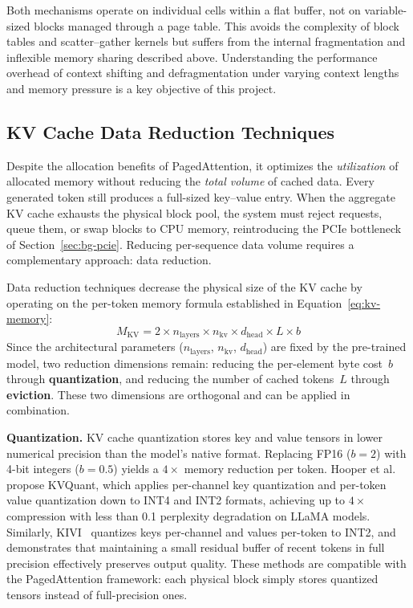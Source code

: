 \documentclass[
english,                 %
bibtex,                  %
]{kththesis}
\numberwithin{listing}{chapter}
\begin{document}
Both mechanisms operate on individual cells within a flat buffer, not on variable-sized blocks managed through a page table. This avoids the complexity of block tables and scatter--gather kernels but suffers from the internal fragmentation and inflexible memory sharing described above. Understanding the performance overhead of context shifting and defragmentation under varying context lengths and memory pressure is a key objective of this project.

\subsection{KV Cache Data Reduction Techniques}
\label{sec:bg-data-reduction}

Despite the allocation benefits of PagedAttention, it optimizes the \textit{utilization} of allocated memory without reducing the \textit{total volume} of cached data. Every generated token still produces a full-sized key--value entry. When the aggregate \gls{KV} cache exhausts the physical block pool, the system must reject requests, queue them, or swap blocks to \gls{CPU} memory, reintroducing the PCIe bottleneck of Section~\ref{sec:bg-pcie}. Reducing per-sequence data volume requires a complementary approach: data reduction.

Data reduction techniques decrease the physical size of the \gls{KV} cache by operating on the per-token memory formula established in Equation~\ref{eq:kv-memory}:
%
\begin{equation*}
  M_{\text{KV}} = 2 \times n_{\text{layers}} \times n_{\text{kv}} \times d_{\text{head}} \times L \times b
\end{equation*}
%
Since the architectural parameters ($n_{\text{layers}}$, $n_{\text{kv}}$, $d_{\text{head}}$) are fixed by the pre-trained model, two reduction dimensions remain: reducing the per-element byte cost~$b$ through \textbf{quantization}, and reducing the number of cached tokens~$L$ through \textbf{eviction}. These two dimensions are orthogonal and can be applied in combination.

\textbf{Quantization.} \gls{KV} cache quantization stores key and value tensors in lower numerical precision than the model's native format. Replacing \gls{FP16} ($b=2$) with 4-bit integers ($b=0.5$) yields a $4\times$ memory reduction per token. Hooper et al.~\cite{hooper2024kvquant} propose KVQuant, which applies per-channel key quantization and per-token value quantization down to INT4 and INT2 formats, achieving up to $4\times$ compression with less than 0.1 perplexity degradation on LLaMA models. Similarly, KIVI~\cite{liu2024kivi} quantizes keys per-channel and values per-token to INT2, and demonstrates that maintaining a small residual buffer of recent tokens in full precision effectively preserves output quality. These methods are compatible with the PagedAttention framework: each physical block simply stores quantized tensors instead of full-precision ones.
\end{document}
